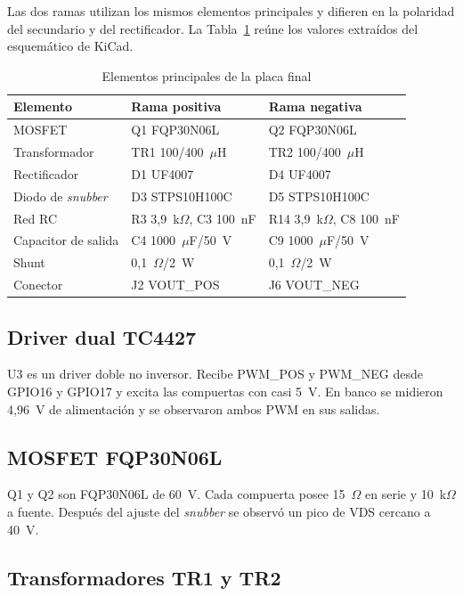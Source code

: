 \documentclass[conference]{IEEEtran}
\begin{document}
Las dos ramas utilizan los mismos elementos principales y difieren en la polaridad del secundario y del rectificador. La Tabla~\ref{tab:potencia} reúne los valores extraídos del esquemático de KiCad.

\begin{table}[!t]
\caption{Elementos principales de la placa final}
\label{tab:potencia}
\centering
\footnotesize
\begin{tabular}{@{}lll@{}}
\toprule
\textbf{Elemento} & \textbf{Rama positiva} & \textbf{Rama negativa} \\
\midrule
MOSFET & Q1 FQP30N06L & Q2 FQP30N06L \\
Transformador & TR1 100/400~$\mu$H & TR2 100/400~$\mu$H \\
Rectificador & D1 UF4007 & D4 UF4007 \\
Diodo de \textit{snubber} & D3 STPS10H100C & D5 STPS10H100C \\
Red RC & R3 3,9~k$\Omega$, C3 100~nF & R14 3,9~k$\Omega$, C8 100~nF \\
Capacitor de salida & C4 1000~$\mu$F/50~V & C9 1000~$\mu$F/50~V \\
Shunt & 0,1~$\Omega$/2~W & 0,1~$\Omega$/2~W \\
Conector & J2 VOUT\_POS & J6 VOUT\_NEG \\
\bottomrule
\end{tabular}
\end{table}

\subsection{Driver dual TC4427}

U3 es un driver doble no inversor. Recibe PWM\_POS y PWM\_NEG desde GPIO16 y GPIO17 y excita las compuertas con casi 5~V. En banco se midieron 4,96~V de alimentación y se observaron ambos PWM en sus salidas.

\subsection{MOSFET FQP30N06L}

Q1 y Q2 son FQP30N06L de 60~V. Cada compuerta posee 15~$\Omega$ en serie y 10~k$\Omega$ a fuente. Después del ajuste del \textit{snubber} se observó un pico de VDS cercano a 40~V.

\subsection{Transformadores TR1 y TR2}
\end{document}
